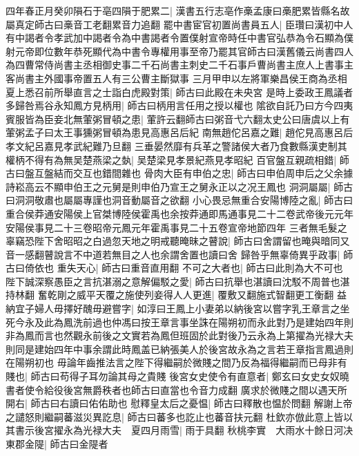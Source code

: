 四年春正月癸卯隕石于亳四隕于肥累二|{
	漢書五行志亳作槀孟康曰槀肥累皆縣名故屬真定師古曰槀音工老翻累音力追翻}
罷中書宦官初置尚書員五人|{
	臣瓚曰漢初中人有中謁者令孝武加中謁者令為中書謁者令置僕射宣帝時任中書官弘恭為令石顯為僕射元帝即位數年恭死顯代為中書令專權用事至帝乃罷其官師古曰漢舊儀云尚書四人為四曹常侍尚書主丞相御史事二千石尚書主刺史二千石事戶曹尚書主庶人上書事主客尚書主外國事帝置五人有三公曹主斷獄事}
三月甲申以左將軍樂昌侯王商為丞相　夏上悉召前所舉直言之士詣白虎殿對策|{
	師古曰此殿在未央宮}
是時上委政王鳳議者多歸咎焉谷永知鳳方見柄用|{
	師古曰柄用言任用之授以權也}
隂欲自託乃曰方今四夷賓服皆為臣妾北無葷粥冒頓之患|{
	葷許云翻師古曰粥音弋六翻太史公曰唐虞以上有葷粥孟子曰太王事獯粥冒頓為患見高惠呂后紀}
南無趙佗呂嘉之難|{
	趙佗見高惠呂后孝文紀呂嘉見孝武紀難乃旦翻}
三垂晏然靡有兵革之警諸侯大者乃食數縣漢吏制其權柄不得有為無吴楚燕梁之埶|{
	吴楚梁見孝景紀燕見孝昭紀}
百官盤互親疏相錯|{
	師古曰盤互盤結而交互也錯間雜也}
骨肉大臣有申伯之忠|{
	師古曰申伯周申后之父余據詩崧高云不顯申伯王之元舅是則申伯乃宣王之舅永正以之况王鳳也}
洞洞屬屬|{
	師古曰洞洞敬肅也屬屬專謹也洞音動屬音之欲翻}
小心畏忌無重合安陽博陸之亂|{
	師古曰重合侯莽通安陽侯上官桀博陸侯霍禹也余按莽通即馬通事見二十二卷武帝後元元年安陽侯事見二十三卷昭帝元鳳元年霍禹事見二十五卷宣帝地節四年}
三者無毛髮之辜竊恐陛下舍昭昭之白過忽天地之明戒聽晻昧之瞽說|{
	師古曰舍謂留也晻與暗同又音一感翻瞽說言不中道若無目之人也余謂舍置也讀曰舍}
歸咎乎無辜倚異乎政事|{
	師古曰倚依也}
重失天心|{
	師古曰重音直用翻}
不可之大者也|{
	師古曰此則為大不可也}
陛下誠深察愚臣之言抗湛溺之意解偏駁之愛|{
	師古曰抗舉也湛讀曰沈駁不周普也湛持林翻}
奮乾剛之威平天覆之施使列妾得人人更進|{
	覆敷又翻施式智翻更工衡翻}
益納宜子婦人毋擇好醜毋避嘗字|{
	如淳曰王鳳上小妻弟以納後宮以嘗字乳王章言之坐死今永及此為鳳洗前過也仲馮曰按王章言事坐誅在陽朔初而永此對乃是建始四年則非為鳳而言也然觀永前後之文實若為鳳但班固於此對後乃云永為上第擢為光禄大夫則同是建始四年中事余謂此時鳳盖已納張美人於後宮故永為之言若王章指言鳳過則在陽朔初也}
毋論年齒推法言之陛下得繼嗣於微賤之間乃反為福得繼嗣而已母非有賤也|{
	師古曰苟得子耳勿論其母之貴賤}
後宮女史使令有直意者|{
	鄭玄曰女史女奴曉書者使令給役後宮無爵秩者也師古曰直當也令音力成翻}
廣求於微賤之間以遇天所開右|{
	師古曰右讀曰佑佑助也}
慰釋皇太后之憂愠|{
	師古曰釋散也愠於問翻}
解謝上帝之譴怒則繼嗣蕃滋災異訖息|{
	師古曰蕃多也訖止也蕃音扶元翻}
杜欽亦倣此意上皆以其書示後宮擢永為光禄大夫　夏四月雨雪|{
	雨于具翻}
秋桃李實　大雨水十餘日河决東郡金隄|{
	師古曰金隄者}


